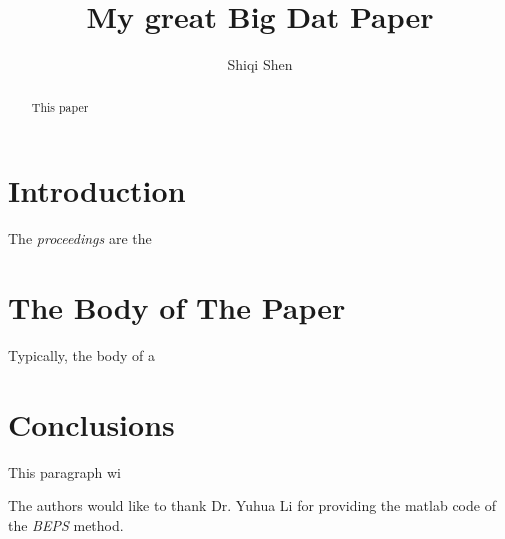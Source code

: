 \documentclass[sigconf]{acmart}
\begin{document}
\title{My great Big Dat Paper}


\author{Shiqi Shen}

\renewcommand{\shortauthors}{B. Trovato et al.}


\begin{abstract}
This paper 
\end{abstract}



\maketitle

\section{Introduction}

The \textit{proceedings} are the \cite{Zhang2017era}

\section{The Body of The Paper}

Typically, the body of a \cite{Schlieski2012data}

\section{Conclusions}

This paragraph wi \cite{Villars2011care}


\begin{acks}

  The authors would like to thank Dr. Yuhua Li for providing the
  matlab code of the \textit{BEPS} method.

\end{acks}


 
\end{document}
